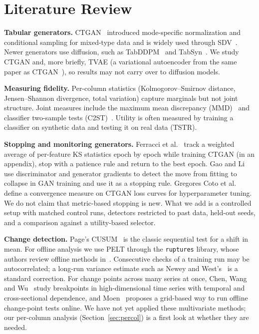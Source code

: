 \documentclass[conference]{IEEEtran}
\begin{document}
\section{Literature Review}
\textbf{Tabular generators.} CTGAN~\cite{xu2019ctgan} introduced
mode-specific normalization and conditional sampling for mixed-type data and
is widely used through SDV~\cite{patki2016sdv}. Newer generators use
diffusion, such as TabDDPM~\cite{kotelnikov2023tabddpm} and
TabSyn~\cite{zhang2024tabsyn}. We study CTGAN and, more briefly, TVAE (a
variational autoencoder from the same paper as CTGAN~\cite{xu2019ctgan}), so
results may not carry over to diffusion models.

\textbf{Measuring fidelity.} Per-column statistics (Kolmogorov--Smirnov
distance, Jensen--Shannon divergence, total variation) capture marginals but
not joint structure. Joint measures include the maximum mean discrepancy
(MMD)~\cite{gretton2012kernel} and classifier two-sample tests
(C2ST)~\cite{lopezpaz2017c2st}. Utility is often measured by training a
classifier on synthetic data and testing it on real data (TSTR).

\textbf{Stopping and monitoring generators.} Ferracci et
al.~\cite{ferracci2024targeted} track a weighted average of per-feature KS
statistics epoch by epoch while training CTGAN (in an appendix), stop with a
patience rule and return to the best epoch. Gao and
Li~\cite{gao2025gradients} use discriminator and generator gradients to
detect the move from fitting to collapse in GAN training and use it as a
stopping rule. Gregores Coto et al.~\cite{gregores2026ctgan} define a
convergence measure on CTGAN loss curves for hyperparameter tuning. We do
not claim that metric-based stopping is new. What we add is a controlled
setup with matched control runs, detectors restricted to past data, held-out
seeds, and a comparison against a utility-based selector.

\textbf{Change detection.} Page's CUSUM~\cite{page1954cusum} is the classic
sequential test for a shift in mean. For offline analysis we use PELT
\cite{killick2012pelt} through the \texttt{ruptures} library, whose authors
review offline methods in~\cite{truong2020review}. Consecutive checks of a
training run may be autocorrelated; a long-run variance estimate such as
Newey and West's~\cite{newey1987hac} is a standard correction. For change
points across many series at once, Chen, Wang and Wu~\cite{chen2022breakpoints}
study breakpoints in high-dimensional time series with temporal and
cross-sectional dependence, and Moen~\cite{moen2025grid} proposes a
grid-based way to run offline change-point tests online. We have not yet
applied these multivariate methods; our per-column analysis
(Section~\ref{sec:percol}) is a first look at whether they are needed.
\end{document}
